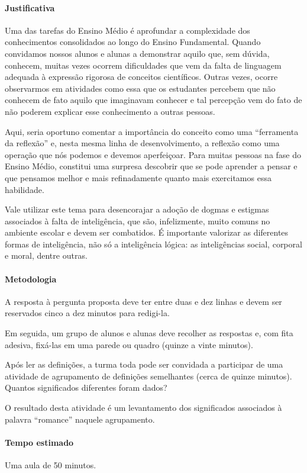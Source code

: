 \documentclass[12pt]{extarticle}
\begin{document}
\paragraph{Justificativa}
Uma das tarefas do Ensino Médio é aprofundar a complexidade dos
conhecimentos consolidados ao longo do Ensino Fundamental. Quando
convidamos nossos alunos e alunas a demonstrar aquilo que, sem dúvida,
conhecem, muitas vezes ocorrem dificuldades que vem da falta de
linguagem adequada à expressão rigorosa de conceitos científicos. Outras
vezes, ocorre observarmos em atividades como essa que os estudantes
percebem que não conhecem de fato aquilo que imaginavam conhecer e tal
percepção vem do fato de não poderem explicar esse conhecimento a outras
pessoas.

Aqui, seria oportuno comentar a importância do conceito como uma
``ferramenta da reflexão'' e, nesta mesma linha de desenvolvimento, a
reflexão como uma operação que nós podemos e devemos aperfeiçoar. Para
muitas pessoas na fase do Ensino Médio, constitui uma surpresa descobrir
que se pode aprender a pensar e que pensamos melhor e mais refinadamente
quanto mais exercitamos essa habilidade.

Vale utilizar este tema para desencorajar a adoção de dogmas e estigmas
associados à falta de inteligência, que são, infelizmente, muito comuns
no ambiente escolar e devem ser combatidos. É importante valorizar as
diferentes formas de inteligência, não só a inteligência lógica: as
inteligências social, corporal e moral, dentre outras.


\paragraph{Metodologia}
A resposta à pergunta proposta deve ter entre duas e dez linhas e devem ser reservados cinco a dez minutos para redigi-la.

Em seguida, um grupo de alunos e alunas deve recolher as respostas e,
com fita adesiva, fixá-las em uma parede ou quadro (quinze a vinte
minutos).

Após ler as definições, a turma toda pode ser convidada a participar de
uma atividade de agrupamento de definições semelhantes (cerca de quinze
minutos). Quantos significados diferentes foram dados?

O resultado desta atividade é um levantamento dos significados
associados à palavra ``romance'' naquele agrupamento.

\paragraph{Tempo estimado} Uma aula de 50 minutos.
\end{document}

